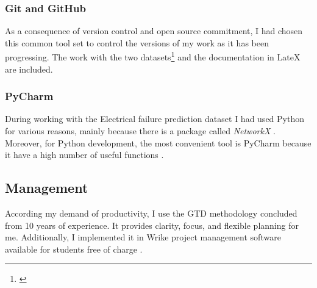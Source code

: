 			\subsubsection{Git and GitHub}
As a consequence of version control and open source commitment, I had chosen this common tool set \cite{Github} to control the versions of my work as it has been progressing. The work with the two datasets\footnote{\cite{GitHub_CAN_RUL,GitHub_FP_RUL}} and the documentation in LateX \cite{GitHub_Thesis_Text} are included.
			\subsubsection{PyCharm}
During working with the Electrical failure prediction dataset I had used Python for various reasons, mainly because there is a package called \textit{NetworkX} \cite{NetworkX}. Moreover, for Python development, the most convenient tool is PyCharm because it have a high number of useful functions \cite{PyCharm}.	
		\subsection{Management}
According my demand of productivity, I use the GTD \cite{GTD} methodology concluded from 10 years of experience. It provides clarity, focus, and flexible planning for me. Additionally, I implemented it in Wrike \cite{WRIKE} project management software available for students free of charge \cite{WRIKE_for_students}.